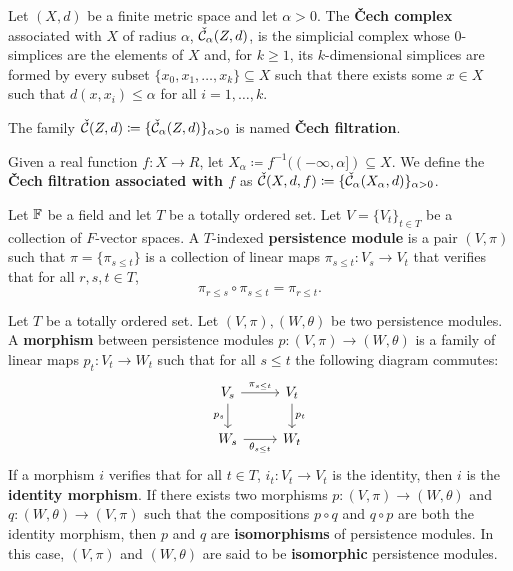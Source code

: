 \begin{definition}
    Let $ (X, d) $ be a finite metric space and let $ \alpha > 0 $. The {\bf Čech complex} associated with $ X $ of radius $ \alpha $, $\check{\mathcal{C}}_\alpha(Z, d)$, is the simplicial complex whose $0$-simplices are the elements of $X$ and, for $k \geq 1$, its $k$-dimensional simplices are formed by every subset $ \{x_0, x_1, \dots, x_k\} \subseteq X $ such that there exists some $ x \in X $ such that $ d(x, x_i) \leq \alpha $ for all $i = 1, \dots, k$.

    The family $\check{\mathcal{C}}(Z, d) \coloneq \{\check{\mathcal{C}}_\alpha(Z, d)\}_{\alpha > 0}$ is named {\bf Čech filtration}.

    Given a real function $ f \colon X \to R $, let $ X_\alpha \coloneq f^{-1}((-\infty, \alpha]) \subseteq X $. We define the {\bf Čech filtration associated with $ f $} as $ \check{\mathcal{C}}(X, d, f) \coloneq \{\check{\mathcal{C}}_\alpha(X_\alpha, d)\}_{\alpha>0}$.
\end{definition}

\begin{definition}
    Let $\mathbb F$ be a field and let $T$ be a totally ordered set. Let $ V = \{V_t\}_{t \in T} $ be a collection of $F$-vector spaces. A $T$-indexed {\bf persistence module} is a pair $ (V, \pi) $ such that $ \pi = \{ \pi_{s \leq t} \} $ is a collection of linear maps $ \pi_{s \leq t}\colon V_s \rightarrow V_t $ that verifies that for all $ r, s, t \in T $,
    \begin{equation}
        \pi_{r \leq s} \circ \pi_{s \leq t} = \pi_{r \leq t}.
    \end{equation}
\end{definition}

\begin{definition}
    Let $T$ be a totally ordered set. Let $ (V, \pi), (W, \theta) $ be two persistence modules. A {\bf morphism} between persistence modules $ p \colon (V, \pi) \to (W, \theta) $ is a family of linear maps $ p_t \colon V_t \to W_t $ such that for all $ s \leq t $ the following diagram commutes:
    $$
    \begin{tikzcd}
        V_s \arrow[r, "\pi_{s \leq t}"] \arrow[d, "p_s"'] & V_t \arrow[d, "p_t"] \\
        W_s \arrow[r, "\theta_{s \leq t}"']               & W_t
    \end{tikzcd}
    $$
    If a morphism $ i $ verifies that for all $ t \in T $, $ i_t \colon V_t \to V_t $ is the identity, then $ i $ is the {\bf identity morphism}. If there exists two morphisms $ p \colon (V, \pi) \to (W, \theta) $ and $ q \colon (W, \theta) \to (V, \pi) $ such that the compositions $ p \circ q $ and $ q \circ p $ are both the identity morphism, then $ p $ and $ q $ are {\bf isomorphisms} of persistence modules. In this case, $ (V, \pi) $ and $ (W, \theta) $ are said to be {\bf isomorphic} persistence modules.
\end{definition}


